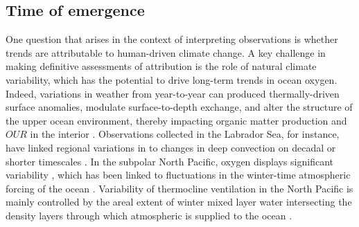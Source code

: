 \documentclass[draft,linenumbers]{report_chapter}
\begin{document}
\subsection{Time of emergence}\label{loc:toe}

One question that arises in the context of interpreting observations is whether trends are attributable to human-driven climate change.
A key challenge in making definitive assessments of attribution is the role of natural climate variability, which has the potential to drive long-term trends in ocean oxygen.
Indeed, variations in weather from year-to-year can produced thermally-driven surface  anomalies, modulate surface-to-depth exchange, and alter the structure of the upper ocean environment, thereby impacting organic matter production and $OUR$ in the interior \citep{Ito-Deutsch-2010,Deutsch-Brix-etal-2011}.
Observations collected in the Labrador Sea, for instance, have linked regional variations in  to changes in deep convection on decadal or shorter timescales \citep{van-Aken-Femke-de-Jong-etal-2011}.
In the subpolar North Pacific, oxygen  displays significant variability \citep{Deutsch-Emerson-etal-2006}, which has been linked to fluctuations in the winter-time atmospheric forcing of the ocean \citep{Andreev-Baturina-2006}.
Variability of thermocline  ventilation in the North Pacific is mainly controlled by the areal extent of winter mixed layer water intersecting the density layers through which atmospheric  is supplied to the ocean \citep{Kwon-Deutsch-etal-2016}.
\end{document}
